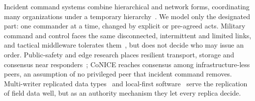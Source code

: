 Incident command systems combine hierarchical and network forms, coordinating many
organizations under a temporary hierarchy~\cite{moynihan2008combining,moynihan2009network}.
We model only the designated part: one commander at a time, changed by explicit or
pre-agreed acts. Military command and control faces the same disconnected, intermittent and
limited links, and tactical middleware tolerates them~\cite{suri2009tactical}, but does not
decide who may issue an order. Public-safety and edge research places resilient transport,
storage and consensus near responders~\cite{kumbhar2015legacy,wang2023overview,sagor2024distressnetng,jahanian2022conice};
CoNICE reaches consensus among infrastructure-less peers, an assumption of no privileged
peer that incident command removes. Multi-writer replicated data
types~\cite{almeida2014delta,hanssen2025emergency} and local-first
software~\cite{kleppmann2019localfirst} serve the replication of field data well, but as
an authority mechanism they let every replica decide. 


